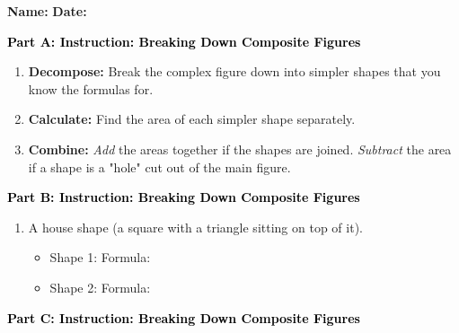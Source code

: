 \documentclass[12pt, letterpaper, fleqn]{article}
\newcommand{\blank}{\underline{\hspace{2.2cm}}}
\newcommand{\blanklong}{\underline{\hspace{6.5cm}}}
\begin{document}
\textbf{Name:} \underline{\hspace{5cm}}
\hfill
\textbf{Date:} \underline{\hspace{3cm}}\\

\begin{tcolorbox}[colback=customteal!20]
\large\textcolor{black}{\textbf{Part A: Instruction: Breaking Down Composite Figures}}
\end{tcolorbox}

\vspace{3mm}

\begin{enumerate}[itemsep=2.2cm, leftmargin=0.6cm]
\item \textbf{Decompose:} Break the complex figure down into simpler shapes that you know the formulas for.
\item \textbf{Calculate:} Find the area of each simpler shape separately.
\item \textbf{Combine:} \textit{Add} the areas together if the shapes are joined. \textit{Subtract} the area if a shape is a "hole" cut out of the main figure.
\end{enumerate}

\newpage

\begin{tcolorbox}[colback=customteal!20]
\large\textcolor{black}{\textbf{Part B: Instruction: Breaking Down Composite Figures}}
\end{tcolorbox}

\vspace{3mm}

\begin{enumerate}[itemsep=2.2cm, leftmargin=0.6cm, resume]
\item A house shape (a square with a triangle sitting on top of it).
\begin{itemize}
\item Shape 1: \blanklong Formula: \blank
\item Shape 2: \blanklong Formula: \blank
\end{itemize}
\end{enumerate}

\newpage

\begin{tcolorbox}[colback=customteal!20]
\large\textcolor{black}{\textbf{Part C: Instruction: Breaking Down Composite Figures}}
\end{tcolorbox}
\end{document}
